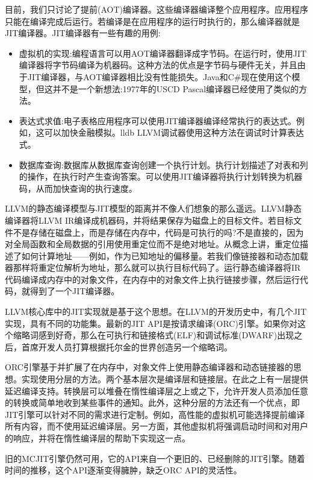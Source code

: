 
目前，我们只讨论了提前(AOT)编译器。这些编译器编译整个应用程序。应用程序只能在编译完成后运行。若编译是在应用程序的运行时执行的，那么编译器就是JIT编译器。JIT编译器有一些有趣的用例:

\begin{itemize}
\item
虚拟机的实现:编程语言可以用AOT编译器翻译成字节码。在运行时，使用JIT编译器将字节码编译为机器码。这种方法的优点是字节码与硬件无关，并且由于JIT编译器，与AOT编译器相比没有性能损失。Java和C\#现在使用这个模型，但这并不是一个新想法:1977年的USCD Pascal编译器已经使用了类似的方法。

\item
表达式求值:电子表格应用程序可以使用JIT编译器编译经常执行的表达式。例如，这可以加快金融模拟。lldb LLVM调试器使用这种方法在调试时计算表达式。

\item
数据库查询:数据库从数据库查询创建一个执行计划。执行计划描述了对表和列的操作，在执行时产生查询答案。可以使用JIT编译器将执行计划转换为机器码，从而加快查询的执行速度。
\end{itemize}

LLVM的静态编译模型与JIT模型的距离并不像人们想象的那么遥远。LLVM静态编译器将LLVM IR编译成机器码，并将结果保存为磁盘上的目标文件。若目标文件不是存储在磁盘上，而是存储在内存中，代码是可执行的吗?不是直接的，因为对全局函数和全局数据的引用使用重定位而不是绝对地址。从概念上讲，重定位描述了如何计算地址——例如，作为已知地址的偏移量。若我们像链接器和动态加载器那样将重定位解析为地址，那么就可以执行目标代码了。运行静态编译器将IR代码编译成内存中的对象文件，在内存中的对象文件上执行链接步骤，然后运行代码，就得到了一个JIT编译器。

LLVM核心库中的JIT实现就是基于这个思想。在LLVM的开发历史中，有几个JIT实现，具有不同的功能集。最新的JIT API是按请求编译(ORC)引擎。如果你对这个缩略词感到好奇，那么在可执行和链接格式(ELF)和调试标准(DWARF)出现之后，首席开发人员打算根据托尔金的世界创造另一个缩略词。

ORC引擎基于并扩展了在内存中，对象文件上使用静态编译器和动态链接器的思想。实现使用分层的方法。两个基本层次是编译层和链接层。在此之上有一层提供延迟编译支持。转换层可以堆叠在惰性编译层之上或之下，允许开发人员添加任意的转换或简单地收到某些事件的通知。此外，这种分层的方法还有一个优点，即JIT引擎可以针对不同的需求进行定制。例如，高性能的虚拟机可能选择提前编译所有内容，而不使用延迟编译层。另一方面，其他虚拟机将强调启动时间和对用户的响应，并将在惰性编译层的帮助下实现这一点。

旧的MCJIT引擎仍然可用，它的API来自一个更旧的、已经删除的JIT引擎。随着时间的推移，这个API逐渐变得臃肿，缺乏ORC API的灵活性。

